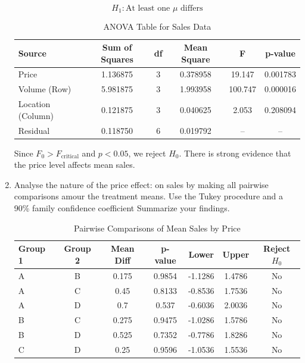 \documentclass{article}
\begin{document}
\begin{enumerate}
	      \[
		      H_1: \text{At least one } \mu \text{ differs}
	      \]
	      \begin{table}[!ht]
		      \centering
		      \caption{ANOVA Table for Sales Data}
		      \begin{tabular}{lccccc}
			      \toprule
			      Source            & Sum of Squares & df & Mean Square & F       & p-value  \\
			      \midrule
			      Price             & 1.136875       & 3  & 0.378958    & 19.147  & 0.001783 \\
			      Volume (Row)      & 5.981875       & 3  & 1.993958    & 100.747 & 0.000016 \\
			      Location (Column) & 0.121875       & 3  & 0.040625    & 2.053   & 0.208094 \\
			      Residual          & 0.118750       & 6  & 0.019792    & --      & --       \\
			      \bottomrule
		      \end{tabular}
	      \end{table}
	      Since $F_0 > F_{\text{critical}}$ and $p < 0.05$, we reject $H_0$. There is strong evidence that the price level affects mean sales.
	\item Analyse the nature of the price effect: on sales by making all pairwise comparisons amour the treatment means.
	      Use the Tukey procedure and a 90\% family confidence coefficient Summarize your findings.
	      \begin{table}[h!]
		      \centering
		      \caption{Pairwise Comparisons of Mean Sales by Price}
		      \begin{tabular}{lcccccc}
			      \toprule
			      Group 1 & Group 2 & Mean Diff & p-value & Lower   & Upper  & Reject $H_0$ \\
			      \midrule
			      A       & B       & 0.175     & 0.9854  & -1.1286 & 1.4786 & No           \\
			      A       & C       & 0.45      & 0.8133  & -0.8536 & 1.7536 & No           \\
			      A       & D       & 0.7       & 0.537   & -0.6036 & 2.0036 & No           \\
			      B       & C       & 0.275     & 0.9475  & -1.0286 & 1.5786 & No           \\
			      B       & D       & 0.525     & 0.7352  & -0.7786 & 1.8286 & No           \\
			      C       & D       & 0.25      & 0.9596  & -1.0536 & 1.5536 & No           \\

\end{tabular}
\end{table}
\end{enumerate}
\end{document}
